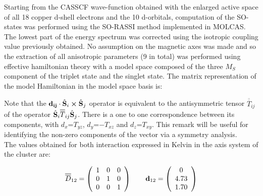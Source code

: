 \documentclass[12pt]{report}
\numberwithin{equation}{section}
\begin{document}
Starting from the CASSCF wave-function obtained with the enlarged active space of all 18 copper d-shell electrons and the 10 d-orbitals, computation of the SO-states was performed using the SO-RASSI method implemented in MOLCAS.
The lowest part of the energy spectrum was corrected using the isotropic coupling value previously obtained.
No assumption on the magnetic axes was made and so the extraction of all anisotropic parameters (9 in total) was performed using effective hamiltonian theory with a model space composed of the three $M_S$ component of the triplet state and the singlet state.
The matrix representation of the model Hamiltonian in the model space basis is:
\begin{center}
    \centering
\end{center}
Note that the $\vb{d_{ij}} \cdot \hat{\vb{S}}_i \cross \hat{\vb{S}}_j$ operator is equivalent to the antisymmetric tensor $\overline{\overline{T}}_{ij}$ of the operator $\hat{\vb{S}}_i \overline{\overline{T}}_{ij} \hat{\vb{S}}_j$.
There is a one to one correspondence between its components, with $d_x$=$T_{yz}$, $d_y$=$-T_{xz}$ and $d_z$=$T_{xy}$.
This remark will be useful for identifying the non-zero components of the vector via a symmetry analysis.\\
The values obtained for both interaction expressed in Kelvin in the axis system of the cluster are:

\[ \overline{\overline{D}}_{12}= \left( \begin{array}{c c c}
    1 & 0 & 0\\
    0 & 1 & 0\\
    0 & 0 & 1
    \end{array} \right)
    \qquad
    \vb{d}_{12}=
    \left( \begin{array}{c}
    0  \\
    4.73  \\
    1.70
    \end{array} \right)
    \]
    
\end{document}
